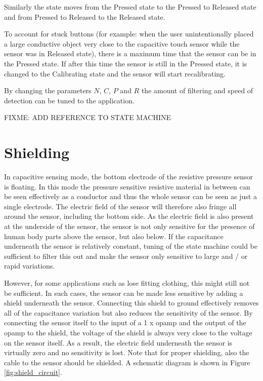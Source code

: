 \documentclass{sigchi-ext}
\begin{document}
Similarly the state moves from the Pressed state to the Pressed to Released
state and from Pressed to Released to the Released state.

To account for stuck buttons (for example: when the user unintentionally placed
a large conductive object very close to the capacitive touch sensor while the
sensor was in Released state), there is a maximum time that the sensor can be in
the Pressed state. If after this time the sensor is still in the Pressed state,
it is changed to the Calibrating state and the sensor will start recalibrating.

By changing the parameters $N$, $C$, $P$ and $R$ the amount of filtering and
speed of detection can be tuned to the application.

FIXME: ADD REFERENCE TO STATE MACHINE 

\section{Shielding}
In capacitive sensing mode, the bottom electrode of the resistive pressure
sensor is floating. In this mode the pressure sensitive resistive material in
between can be seen effectively as a conductor and thus the whole sensor can be
seen as just a single electrode. The electric field of the sensor will therefore
also fringe all around the sensor, including the bottom side. As the electric
field is also present at the underside of the sensor, the sensor is not only
sensitive for the presence of human body parts above the sensor, but also below.
If the capacitance underneath the sensor is relatively constant, tuning of the
state machine could be sufficient to filter this out and make the sensor only
sensitive to large and / or rapid variations.

However, for some applications such as lose fitting clothing, this might still
not be sufficient. In such cases, the sensor can be made less sensitive by
adding a shield underneath the sensor. Connecting this shield to ground
effectively removes all of the capacitance variation but also reduces the
sensitivity of the sensor. By connecting the sensor itself to the input of a 1 x
opamp and the output of the opamp to the shield, the voltage of the shield is
always very close to the voltage on the sensor itself. As a result, the electric
field underneath the sensor is virtually zero and no sensitivity is lost. Note
that for proper shielding, also the cable to the sensor should be shielded. A
schematic diagram is shown in Figure \ref{fig:shield_circuit}.
\end{document}
